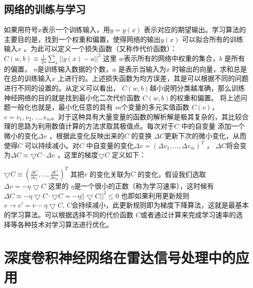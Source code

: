 \subsection{网络的训练与学习}
如果用符号$x $表示一个训练输入，用$y=y(x) $ 表示对应的期望输出。学习算法的主要目的是，找到一个权重和偏置，使得网络的输出$y(x) $ 可以拟合所有的训练输入$x$ 。为此可以定义一个损失函数（又称作代价函数）：
$C(w,b)\equiv \frac{1}{2n}\sum_x||y(x)-a||^2 $
这里 $w$表示所有的网络中权重的集合，$b$ 是所有的偏置， $n$是训练输入数据的个数，$a$ 是表示当输入为$x$ 时输出的向量，求和总是在总的训练输入$x$ 上进行的。上述损失函数为均方误差，其是可以根据不同的问题进行不同的设置的。从定义可以看出， $C(w,b) $越小说明分类越准确，那么训练神经网络的目的就是找到最小化二次代价函数 $C(w,b) $的权重和偏置。
将上述问题一般化也就是，最小化任意的具有 $m $个变量的多元实值函数 $C(v) $， $v=v_1,v_2,\dots,v_m $。对于这种具有大量变量的函数的解析解是极其复杂的，其比较合理的思路为利用数值计算的方法求取其极值点。每次对于$C $ 中的自变量 添加一个微小的变化$\Delta v $ ，根据此变化反映出来的$C $ 的变换 $\Delta C $更新下次的微小变化，从而使得$C $ 可以持续减小。对$C $ 中自变量的变化$\Delta v=(\Delta v_1,\dots,\Delta v_m)^T $ ， $\Delta C $将会变为$\Delta C \approx \bigtriangledown C \cdot \Delta v $ ，这里的梯度$\bigtriangledown C $ 定义如下：

$\bigtriangledown C \equiv (\frac{\partial C}{\partial v_1},\dots,\frac{\partial C}{\partial v_m})^T $
其把$v $ 的变化关联为$C$ 的变化，假设我们选取
$\Delta v=-\eta \bigtriangledown C $
这里的 $\eta $是一个很小的正数（称为学习速率），这时候有
$\Delta C \approx -\eta\bigtriangledown C\cdot\bigtriangledown C=-\eta||\bigtriangledown C||^2 \leq 0$
也即如果利用更新规则
$v \rightarrow v'=v-\eta \bigtriangledown C$,
$C $会持续减小，此更新规则即为梯度下降算法，这就是最基本的学习算法。可以根据选择不同的代价函数 $C $或者通过计算来完成学习速率的选择等各种技术对学习算法进行优化。

\section{深度卷积神经网络在雷达信号处理中的应用}
